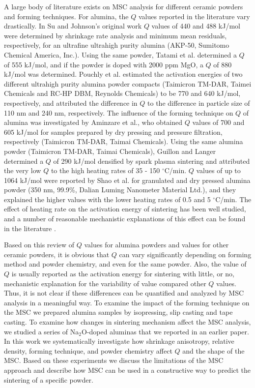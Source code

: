 A large body of literature exists on MSC analysis for different ceramic powders and forming techniques. For alumina, the $Q$ values reported in the literature vary drastically. In Su and Johnson's original work \cite{Su1996} $Q$ values of 440 and 488 kJ/mol were determined by shrinkage rate analysis and minimum mean residuals, respectively, for an ultrafine ultrahigh purity alumina (AKP-50, Sumitomo Chemical America, Inc.). Using the same powder, Tatami et al. \cite{Tatami2006} determined a $Q$ of 555 kJ/mol, and if the powder is doped with 2000 ppm MgO, a $Q$ of 880 kJ/mol was determined. Pouchly et al. \cite{Pouchly2009} estimated the activation energies of two different ultrahigh purity alumina powder compacts (Taimicron TM-DAR, Taimei Chemicals and RC-HP DBM, Reynolds Chemicals) to be 770 and 640 kJ/mol, respectively, and attributed the difference in $Q$ to the difference in particle size of 110 nm and 240 nm, respectively. The influence of the forming technique on $Q$ of alumina was investigated by Aminzare et al., \cite{Aminzare2010} who obtained $Q$ values of 700 and 605 kJ/mol for samples prepared by dry pressing and pressure filtration, respectively (Taimicron TM-DAR, Taimai Chemicals). Using the same alumina powder (Taimicron TM-DAR, Taimai Chemicals), Guillon and Langer \cite{Guillon2010} determined a $Q$ of 290 kJ/mol densified by spark plasma sintering and attributed the very low $Q$ to the high heating rates of 35 - 150 $^{\circ}$C/min. $Q$ values of up to 1064 kJ/mol were reported by Shao et al. \cite{Shao2009} for granulated and dry pressed alumina powder (350 nm, 99.9\%, Dalian Luming Nanometer Material Ltd.), and they explained the higher values with the lower heating rates of 0.5 and 5 $^{\circ}$C/min. The effect of heating rate on the activation energy of sintering has been well studied, and a number of reasonable mechanistic explanations of this effect can be found in the literature \cite{Olevsky2008,Raether2009}.

Based on this review of $Q$ values for alumina powders and values for other ceramic powders, it is obvious that $Q$ can vary significantly depending on forming method and powder chemistry, and even for the same powder. Also, the value of $Q$ is usually reported as the activation energy for sintering with little, or no, mechanistic explanation for the variability of value compared other $Q$ values. Thus, it is not clear if these differences can be quantified and analyzed by MSC analysis in a meaningful way. To examine the impact of the forming technique on the MSC we prepared alumina samples by isopressing, slip casting and tape casting. To examine how changes in sintering mechanism affect the MSC analysis, we studied a series of Na$_{2}$O-doped aluminas that we reported in an earlier paper. In this work we systematically investigate how shrinkage anisotropy, relative density, forming technique, and powder chemistry affect $Q$ and the shape of the MSC. Based on these experiments we discuss the limitations of the MSC approach and describe how MSC can be used in a constructive way to predict the sintering of a specific powder.

